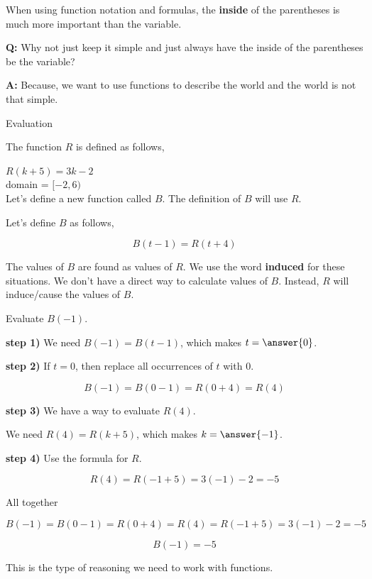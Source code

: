\documentclass{ximera}
\begin{document}
When using function notation and formulas, the \textbf{inside} of the parentheses is much more important than the variable. 



\textbf{Q:} Why not just keep it simple and just always have the inside of the parentheses be the variable? 

\textbf{A:} Because, we want to use functions to describe the world and the world is not that simple. 




\begin{example} Evaluation


The function $R$ is defined as follows,

$R(k + 5) = 3k - 2$ \\
domain = $[-2, 6)$ \\


Let's define a new function called $B$.  The definition of $B$ will use $R$. 



Let's define $B$ as follows,

\[ 
B(t - 1) = R(t + 4)
\]

The values of $B$ are found as values of $R$.  We use the word \textbf{induced} for these situations.  We don't have a direct way to calculate values of $B$.  Instead, $R$ will induce/cause the values of $B$. 


\begin{question} 


Evaluate $B(-1)$. 


\textbf{step 1)}  We need $B(-1) = B(t - 1)$, which makes $t = \answer{0}$. 


\textbf{step 2)}  If $t = 0$, then replace all occurrences of $t$ with $0$. 

\[
B(-1) = B(0 - 1) = R(0 + 4) = R(4)
\]


\textbf{step 3)} We have a way to evaluate $R(4)$.


We need $R(4) = R(k + 5)$, which makes $k = \answer{-1}$. 


\textbf{step 4)} Use the formula for $R$.

\[
R(4) = R(-1 + 5) = 3(-1) - 2 = -5
\]


All together 



\[
B(-1) = B(0 - 1) = R(0 + 4) = R(4) = R(-1 + 5) = 3(-1) - 2 = -5
\]


\[
B(-1) = -5
\]

\end{question}


This is the type of reasoning we need to work with functions. 





\end{example}
\end{document}
